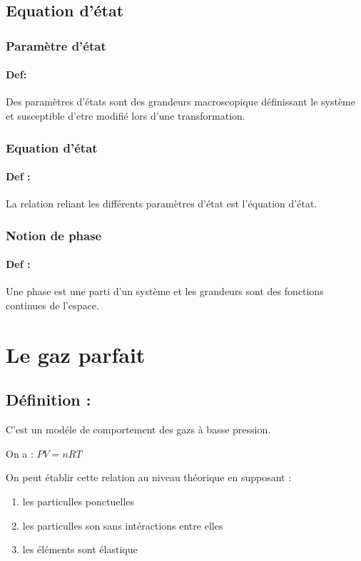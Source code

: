 \documentclass[a4paper,10pt]{report}
\begin{document}
\subsection{Equation d'état}
\subsubsection{Paramètre d'état}
\paragraph{Def:}
Des paramètres d'états sont des grandeurs macroscopique définissant le système et susceptible d'etre modifié lors d'une transformation.

\subsubsection{Equation d'état}
\paragraph{Def :}
La relation reliant les différents paramètres d'état est l'équation d'état.

\subsubsection{Notion de phase}
\paragraph{Def :}
Une phase est une parti d'un système et les grandeurs sont des fonctions continues de l'espace.

\section{Le gaz parfait}
\subsection{Définition :}
C'est un modéle de comportement des gazs à basse pression.

On a : 
\begin{math}
 PV=nRT
\end{math}

On peut établir cette relation au niveau théorique en supposant :
\begin{enumerate}
 \item les particulles ponctuelles
 \item les particulles son sans intéractions entre elles
 \item les éléments sont élastique
\end{enumerate}
\end{document}

